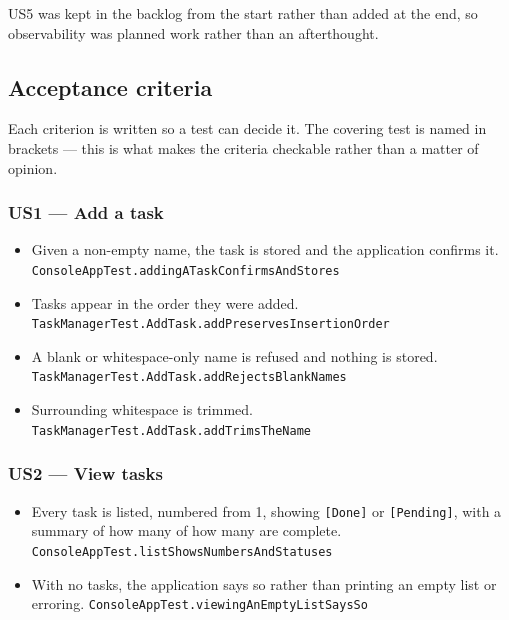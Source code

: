 \documentclass[11pt,a4paper]{article}
\newcommand{\code}[1]{\texttt{\small #1}}
\begin{document}
US5 was kept in the backlog from the start rather than added at the end, so
observability was planned work rather than an afterthought.

\subsection{Acceptance criteria}

Each criterion is written so a test can decide it. The covering test is named in
brackets --- this is what makes the criteria checkable rather than a matter of
opinion.

\subsubsection*{US1 --- Add a task}
\begin{itemize}
  \item Given a non-empty name, the task is stored and the application confirms
        it. \hfill \code{ConsoleAppTest.addingATaskConfirmsAndStores}
  \item Tasks appear in the order they were added. \hfill
        \code{TaskManagerTest.AddTask.addPreservesInsertionOrder}
  \item A blank or whitespace-only name is refused and nothing is stored.
        \hfill \code{TaskManagerTest.AddTask.addRejectsBlankNames}
  \item Surrounding whitespace is trimmed. \hfill
        \code{TaskManagerTest.AddTask.addTrimsTheName}
\end{itemize}

\subsubsection*{US2 --- View tasks}
\begin{itemize}
  \item Every task is listed, numbered from 1, showing \code{[Done]} or
        \code{[Pending]}, with a summary of how many of how many are complete.
        \hfill \code{ConsoleAppTest.listShowsNumbersAndStatuses}
  \item With no tasks, the application says so rather than printing an empty
        list or erroring. \hfill \code{ConsoleAppTest.viewingAnEmptyListSaysSo}
\end{itemize}
\end{document}
